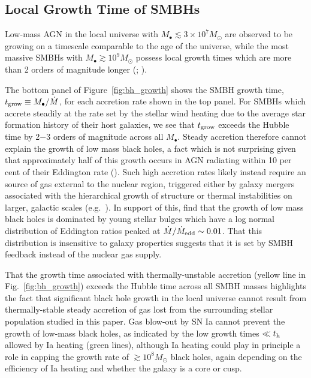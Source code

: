 \documentclass[usenatbib,fleqn]{mn2e}
\newcommand{\Mdot}{\dot{M}}
\begin{document}


\subsection{Local Growth Time of SMBHs }
\label{sec:growth}

Low-mass AGN in the local universe with $M_{\bullet} \lesssim 3\times
10^{7}M_{\odot}$ are observed to be growing on a timescale comparable
to the age of the universe, while the most massive SMBHs with
$M_{\bullet} \gtrsim 10^{9}M_{\odot}$ possess local growth times which
are more than 2 orders of magnitude longer (\citealt{Heckman+04};
\citealt{Kauffmann&Heckman09}).

The bottom panel of Figure~\ref{fig:bh_growth} shows the SMBH growth
time, $t_{\rm grow} \equiv M_{\bullet}/\dot{M}$, for each accretion rate
shown in the top panel.  For SMBHs which accrete steadily at the rate set by the
stellar wind heating due to the average star formation
history of their host galaxies, we see that $t_{\rm grow}$ exceeds the
Hubble time by 2$-$3 orders of magnitude across all $M_{\bullet}$.
Steady accretion therefore cannot explain the growth of low mass black
holes, a fact which is not surprising given that approximately half of
this growth occurs in AGN radiating within 10 per cent of their
Eddington rate (\citealt{Heckman+04}).  Such high accretion rates
likely instead require an source of gas external to the nuclear
region, triggered either by galaxy mergers associated with the
hierarchical growth of structure or thermal instabilities on larger,
galactic scales (e.g.~\citealt{Ciotti+10}).  In support of this,
\citet{Kauffmann&Heckman09} find that the growth of low mass black
holes is dominated by young stellar bulges which have a log normal
distribution of Eddington ratios peaked at $\Mdot/\dot{M}_{\rm edd} \sim
0.01$. That this distribution is insensitive to galaxy properties
suggests that it is set by SMBH feedback instead of the nuclear gas
supply.

That the growth time associated with thermally-unstable accretion
(yellow line in Fig.~\ref{fig:bh_growth}) exceeds the Hubble time across all SMBH masses
highlights the fact that significant black hole growth in the local
universe cannot result from thermally-stable steady accretion of gas
lost from the surrounding stellar population studied in this paper.
Gas blow-out by SN Ia cannot prevent the growth of low-mass black
holes, as indicated by the low growth times $\ll t_{\rm h}$ allowed by
Ia heating (green lines), although Ia heating could play in principle
a role in capping the growth rate of $\gtrsim 10^{8}M_{\odot}$ black
holes, again depending on the efficiency of Ia heating and whether the
galaxy is a core or cusp.
\end{document}
